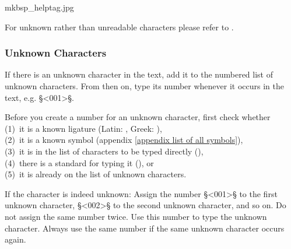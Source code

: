 \begin{sampleImage}{mkbsp_helptag.jpg}

\end{sampleImage}

\begin{crossref}
For unknown rather than unreadable characters please refer to . 
\end{crossref}


\subsubsection{Unknown Characters}
\label{section unknown characters}

\begin{mainrule}
If there is an unknown character in the text, add it to the numbered list of unknown characters. From then on, type its number whenever it occurs in the text, e.g. §<001>§.
\end{mainrule}
 
\begin{clarification}
Before you create a number for an unknown character, first check whether \\
(1)~it is a known ligature (Latin: , Greek: ), \\
(2)~it is a known symbol (appendix \ref{appendix list of all symbols}), \\
(3)~it is in the list of characters to be typed directly (), \\
(4)~there is a standard for typing it (), or \\
(5)~it is already on the list of unknown characters.
 \end{clarification}

\begin{clarification}
If the character is indeed unknown: Assign the number §<001>§ to the first unknown character, §<002>§ to the second unknown character, and so on. Do not assign the same number twice. Use this number to type the unknown character. Always use the same number if the same unknown character occurs again. 
\end{clarification}

